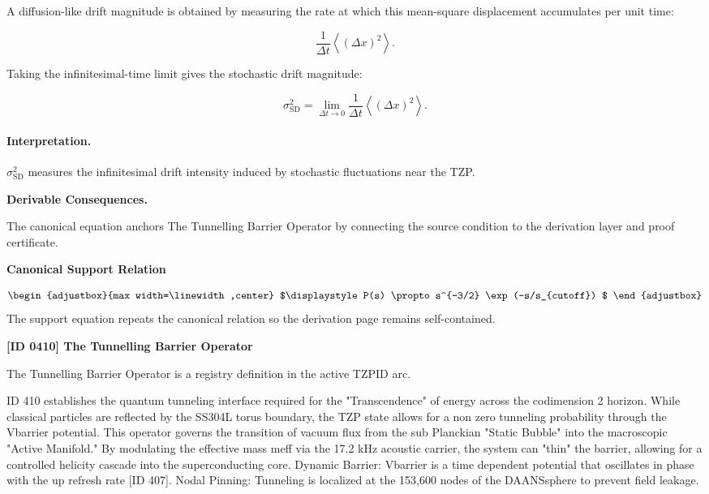 A diffusion-like drift magnitude is obtained by measuring the rate at which this mean-square displacement accumulates per unit time:

\begin{equation}
\frac{1}{\Delta t}
\left\langle(\Delta x)^2\right\rangle .
\end{equation}

Taking the infinitesimal-time limit gives the stochastic drift magnitude:

\begin{equation}
\boxed{
\sigma_{\mathrm{SD}}^{2}
=
\lim_{\Delta t\to 0}
\frac{1}{\Delta t}
\left\langle
(\Delta x)^2
\right\rangle .
}
\end{equation}

\paragraph{Interpretation.}
$\sigma_{\mathrm{SD}}^{2}$ measures the infinitesimal drift intensity induced by stochastic fluctuations near the TZP.

\par\vspace{0.35em}
\noindent\textbf{Derivable Consequences.}\quad
\begingroup
\footnotesize
\raggedright
The canonical equation anchors The Tunnelling Barrier Operator by connecting the source condition to the derivation layer and proof certificate.
\par\endgroup

\noindent\textbf{Canonical Support Relation}\par
\[
\begin{adjustbox}{max width=\linewidth,center}
$\displaystyle
P(s) \propto s^{-3/2} \exp(-s/s_{cutoff})
$
\end{adjustbox}
\]
\noindent The support equation repeats the canonical relation so the derivation page remains self-contained.\par

\clearpage
\noindent\textbf{[ID 0410] The Tunnelling Barrier Operator}\par
\vspace{0.35em}
\begingroup\small
{}
The Tunnelling Barrier Operator is a registry definition in the active TZPID arc.

ID 410 establishes the quantum tunneling interface required for the "Transcendence" of energy across the codimension 2 horizon. While classical particles are reflected by the SS304L torus boundary, the TZP state allows for a non zero tunneling probability through the Vbarrier potential. This operator governs the transition of vacuum flux from the sub Planckian "Static Bubble" into the macroscopic "Active Manifold." By modulating the effective mass meff via the 17.2 kHz acoustic carrier, the system can "thin" the barrier, allowing for a controlled helicity cascade into the superconducting core. Dynamic Barrier: Vbarrier is a time dependent potential that oscillates in phase with the up refresh rate [ID 407]. Nodal Pinning: Tunneling is localized at the 153,600 nodes of the DAANSsphere to prevent field leakage.

